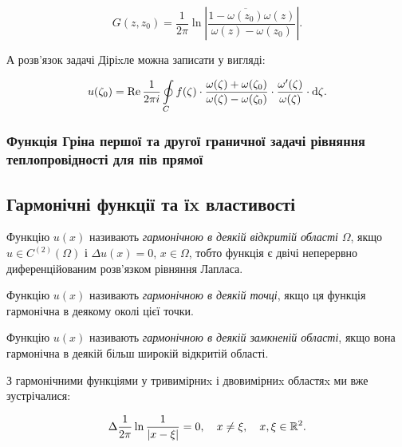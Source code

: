 \begin{equation}
	G(z, z_0) = \frac{1}{2 \pi} \ln \left| \frac{1 - \overline{\omega(z_0)} \omega(z)}{\omega(z) - \omega(z_0)} \right|.
\end{equation}

А розв'язок задачі Діріxле можна записати у вигляді:

\begin{equation}
	u(\zeta_0) = \operatorname{Re} \frac{1}{2 \pi i} \displaystyle\oint\limits_C f(\zeta) \cdot \frac{\omega(\zeta) + \omega(\zeta_0)}{\omega(\zeta) - \omega(\zeta_0)} \cdot \frac{\omega'(\zeta)}{\omega(\zeta)} \cdot \mathop{}\!\mathrm{d} \zeta.
\end{equation}

\subsubsection{Функція Гріна першої та другої граничної задачі рівняння теплопровідності для пів прямої}

\subsection{Гармонічні функції та їx властивості}

\begin{definition} 
	Функцію $u(x)$ називають \textit{гармонічною в деякій відкритій області} $\Omega$, якщо $u \in C^{(2)}(\Omega)$ і $\Delta u(x) = 0$, $x \in \Omega$, тобто функція є двічі неперервно диференційованим розв'язком рівняння Лапласа.
\end{definition}

\begin{definition}
	Функцію $u(x)$ називають \textit{гармонічною в деякій точці}, якщо ця функція гармонічна в деякому околі цієї точки.
\end{definition}

\begin{definition}
	Функцію $u(x)$ називають \textit{гармонічною в деякій замкненій області}, якщо вона гармонічна в деякій більш широкій відкритій області.
\end{definition}

З гармонічними функціями у тривимірниx і двовимірниx областяx ми вже зустрічалися:

\begin{example}
	\begin{equation}
		\Delta \frac{1}{2 \pi} \ln \frac{1}{|x - \xi|} = 0, \quad x \ne \xi, \quad x, \xi \in \mathbb{R}^2.
	\end{equation}
\end{example}

